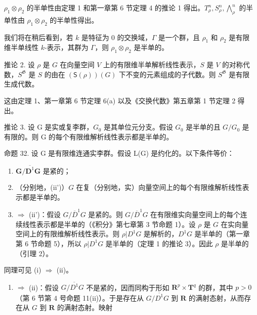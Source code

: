\(\rho_{1} \otimes \rho_{2}\) 的半单性由定理 1 和第一章第 6 节定理 4 的推论 1 得出。\(T^{n}_{\rho}, S^{n}_{\rho}, \bigwedge^{n}_{\rho}\) 的半单性由 \(\rho_{1} \otimes \rho_{2}\) 的半单性得出。

我们将在稍后看到，若 \(k\) 是特征为 0 的交换域，\(\Gamma\) 是一个群，且 \(\rho_1\) 和 \(\rho_2\) 是有限维半单线性 \(k\)-表示，其群为 \(\Gamma\)，则 \(\rho_1 \otimes \rho_2\) 是半单的。

推论 2. 设 \(\rho\) 是 \(G\) 在向量空间 \(V\) 上的有限维半单解析线性表示，\(S\) 是 \(V\) 的对称代数，\(S^{\mathfrak{G}}\) 是 \(S\) 的由在 \((\mathsf{S}(\rho))(G)\) 下不变的元素组成的子代数。则 \(S^{\mathfrak{G}}\) 是有限生成代数。

这由定理 1、第一章第 6 节定理 6(a) 以及《交换代数》第五章第 1 节定理 2 得出。

推论 3. 设 G 是实或复李群，\(G_{0}\) 是其单位元分支。假设 \(G_{0}\) 是半单的且 \(G/G_{0}\) 是有限的。则 G 的每个有限维解析线性表示都是半单的。

命题 32. 设 G 是有限维连通实李群。假设 L(G) 是约化的。以下条件等价：

\begin{enumerate}
\def\labelenumi{(\roman{enumi})}
\item
  \(\mathbf{G} / \overline{\mathbf{D}^1}\mathbf{G}\) 是紧的；
\item
  （分别地，(ii')）\(G\) 在复（分别地，实）向量空间上的每个有限维解析线性表示都是半单的。
\item
  \(\Rightarrow\) (ii')：假设 \(G / \overline{D}^1 G\) 是紧的。则 \(G / \overline{D}^1 G\) 在有限维实向量空间上的每个连续线性表示都是半单的（《积分》第七章第 3 节命题 1）。设 \(\rho\) 是 \(G\) 在实向量空间上的有限维解析线性表示。则 \(\rho |D^1 G\) 是解析的，\(D^1 G\) 是半单的（第一章第 6 节命题 5），所以 \(\rho |D^1 G\) 是半单的（定理 1 的推论 3）。因此 \(\rho\) 是半单的（引理 2）。
\end{enumerate}

同理可见 (i) \(\Rightarrow\) (ii)。

\begin{enumerate}
\def\labelenumi{(\roman{enumi})}
\tightlist
\item
  \(\Rightarrow\) (ii)：假设 \(G / \overline{D^1} G\) 不是紧的，因而同构于形如 \(\mathbf{R}^p\times \mathbf{T}^q\) 的群，其中 \(p > 0\)（第 6 节第 4 号命题 11(ii)）。于是存在从 \(G / \overline{D^1} G\) 到 \(\mathbf{R}\) 的满射态射，从而存在从 \(G\) 到 \(\mathbf{R}\) 的满射态射。映射
\end{enumerate}

